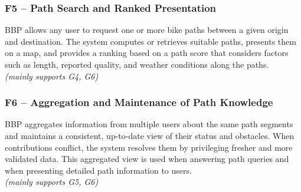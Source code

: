 \subsubsection*{F5 -- Path Search and Ranked Presentation}
BBP allows any user to request one or more bike paths between a given origin and 
destination. The system computes or retrieves suitable paths, presents them on a map, and 
provides a ranking based on a path score that considers factors such as length, reported 
quality, and weather conditions along the paths.\\
\textit{(mainly supports G4, G6)}

\subsubsection*{F6 -- Aggregation and Maintenance of Path Knowledge}
BBP aggregates information from multiple users about the same path segments and maintains 
a consistent, up-to-date view of their status and obstacles. When contributions conflict, the 
system resolves them by privileging fresher and more validated data. This aggregated view 
is used when answering path queries and when presenting detailed path information to users.\\
\textit{(mainly supports G5, G6)}
